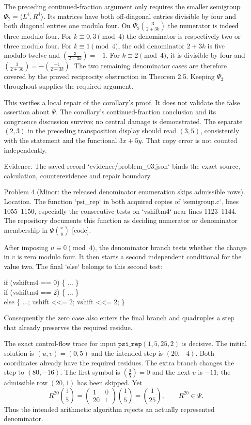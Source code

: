 \documentclass[10pt]{article}
\begin{document}
The preceding continued-fraction argument only requires the smaller semigroup \(\Psi_2=\langle L^4,R^4\rangle\). Its matrices have both off-diagonal entries divisible by four and both diagonal entries one modulo four. On \(\Psi_2\binom{3}{2+3k}\) the numerator is indeed three modulo four. For \(k\equiv0,3\pmod4\) the denominator is respectively two or three modulo four. For \(k\equiv1\pmod4\), the odd denominator \(2+3k\) is five modulo twelve and \(\left(\frac{3}{2+3k}\right)=-1\). For \(k\equiv2\pmod4\), it is divisible by four and \(\left(\frac{3}{2+3k}\right)=-\left(\frac{-1}{2+3k}\right)\). The two remaining denominator cases are therefore covered by the proved reciprocity obstruction in Theorem 2.5. Keeping \(\Psi_2\) throughout supplies the required argument.\par
This verifies a local repair of the corollary’s proof. It does not validate the false assertion about \(\Psi\). The corollary’s continued-fraction conclusion and its congruence discussion survive; no central damage is demonstrated. The separate \((2,3)\) in the preceding transposition display should read \((3,5)\), consistently with the statement and the functional \(3x+5y\). That copy error is not counted independently.\par
Evidence. The saved record `evidence/problem\_03.json` binds the exact source, calculation, counterevidence and repair boundary.\par
Problem 4 (Minor: the released denominator enumeration skips admissible rows).  Location. The function `psi\_rep` in both acquired copies of `semigroup.c`, lines 1055–1150, especially the consecutive tests on `vshiftm4` near lines 1123–1144. The repository documents this function as deciding numerator or denominator membership in \(\Psi\binom{x}{y}\) [code].\par
After imposing \(u\equiv0\pmod4\), the denominator branch tests whether the change in \(v\) is zero modulo four. It then starts a second independent conditional for the value two. The final `else` belongs to this second test:\par
{\ttfamily\footnotesize if (vshiftm4 == 0) \{ ... \}\\
if (vshiftm4 == 2) \{ ... \}\\
else \{ ...; ushift <<= 2; vshift <<= 2; \}}\par
Consequently the zero case also enters the final branch and quadruples a step that already preserves the required residue.\par
The exact control-flow trace for input \(\texttt{psi\_rep}(1,5,25,2)\) is decisive. The initial solution is \((u,v)=(0,5)\) and the intended step is \((20,-4)\). Both coordinates already have the required residues. The extra branch changes the step to \((80,-16)\). The first symbol is \(\left(\frac{0}{5}\right)=0\) and the next \(v\) is \(-11\); the admissible row \((20,1)\) has been skipped. Yet \[R^{20}\binom{1}{5}=\begin{pmatrix}1&0\\20&1\end{pmatrix}\binom{1}{5}=\binom{1}{25},
 \qquad R^{20}\in\Psi.
 \tag{3.4}\] Thus the intended arithmetic algorithm rejects an actually represented denominator.\par
\end{document}
